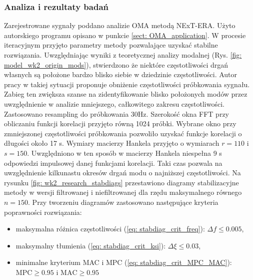 \subsubsection{Analiza i rezultaty badań}
Zarejestrowane sygnały poddano analizie OMA metodą NExT-ERA. Użyto autorskiego programu opisano w punkcie \ref{sect: OMA_application}. W procesie iteracyjnym przyjęto parametry metody pozwalające uzyskać stabilne rozwiązania. Uwzględniając wyniki z teoretycznej analizy modalnej (Rys. \ref{fig: model_wk2_origin_mods}), stwierdzono że niektóre częstotliwości drgań własnych są położone bardzo blisko siebie w dziedzinie częstotliwości. Autor pracy \cite{Caicedo2011} w takiej sytuacji proponuje obniżenie częstotliwości próbkowania sygnału. Zabieg ten zwiększa szanse na zidentyfikowanie blisko położonych modów przez uwzględnienie w analizie mniejszego, całkowitego zakresu częstotliwości. Zastosowano resampling do próbkowania 30Hz. Szerokość okna FFT przy obliczaniu funkcji korelacji przyjęto równą 1024 próbki. Wybrane okno przy zmniejszonej częstotliwości próbkowania pozwoliło uzyskać funkcje korelacji o długości około 17 s. Wymiary macierzy Hankela przyjęto o wymiarach $r=110$ i $s=150$. Uwzględniono w ten sposób w macierzy Hankela niespełna 9 s odpowiedzi impulsowej danej funkcjami korelacji. Taki czas pozwala na uwzględnienie kilkunastu okresów drgań modu o najniższej częstotliwości. Na rysunku \ref{fig: wk2_research_stabdiags} przestawiono diagramy stabilizacyjne metody w wersji filtrowanej i niefiltrowanej dla rzędu maksymalnego równego $n=150$. Przy tworzeniu diagramów zastosowano następujące kryteria poprawności rozwiązania:
\begin{itemize}
	\item maksymalna różnica częstotliwości (\ref{eq: stabdiag_crit_freq}): $\Delta f \le 0.005$,
	\item maksymalny tłumienia (\ref{eq: stabdiag_crit_ksi}): $\Delta \xi \le 0.03$,
	\item minimalne kryterium MAC i MPC (\ref{eq: stabdiag_crit_MPC_MAC}): $\text{MPC}\ge 0.95$ i  $\text{MAC}\ge 0.95$
\end{itemize}


